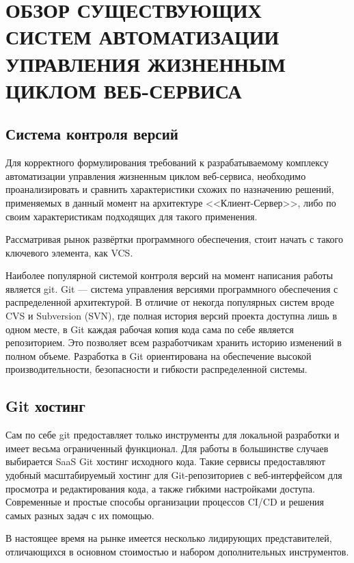 \chapter{ОБЗОР СУЩЕСТВУЮЩИХ СИСТЕМ АВТОМАТИЗАЦИИ УПРАВЛЕНИЯ ЖИЗНЕННЫМ ЦИКЛОМ ВЕБ-СЕРВИСА}
\label{cha:analysis}

\section{Система контроля версий}

Для корректного формулирования требований к разрабатываемому комплексу автоматизации управления жизненным циклом веб-сервиса,
необходимо проанализировать и сравнить характеристики схожих по назначению решений, применяемых в данный момент на архитектуре <<Клиент-Сервер>>,
либо по своим характеристикам подходящих для такого применения.

Рассматривая рынок развёртки программного обеспечения, стоит начать с такого ключевого элемента, как VCS.

Наиболее популярной системой контроля версий на момент написания работы является git\cite{web:git:book}.
Git --- система управления версиями программного обеспечения с распределенной архитектурой.
В отличие от некогда популярных систем вроде CVS и Subversion (SVN),
где полная история версий проекта доступна лишь в одном месте,
в Git каждая рабочая копия кода сама по себе является репозиторием.
Это позволяет всем разработчикам хранить историю изменений в полном объеме.
Разработка в Git ориентирована на обеспечение высокой производительности, безопасности и гибкости распределенной системы.

\section{Git хостинг}

Сам по себе git предоставляет только инструменты для локальной разработки и имеет весьма ограниченный функционал.
Для работы в большинстве случаев выбирается SaaS Git хостинг исходного кода.
Такие сервисы предоставляют удобный масштабируемый хостинг для Git-репозиториев с веб-интерфейсом для просмотра и редактирования кода,
а также гибкими настройками доступа.
Современные и простые способы организации процессов CI/CD и решения самых разных задач с их помощью.

В настоящее время на рынке имеется несколько лидирующих представителей, отличающихся в основном стоимостью и набором дополнительных инструментов\cite{web:git-reps:rating}.

